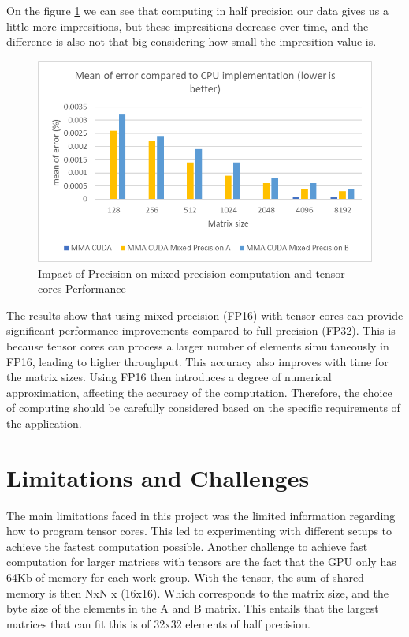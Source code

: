 \documentclass[conference]{IEEEtran}
\begin{document}
  On the figure \ref{fig:precision-impact2} we can see that computing in half precision our data gives us a little more 
  impresitions, but these impresitions decrease over time, and the difference is also not that big considering how small the 
  impresition value is.

  \begin{figure}[htbp]
    \centering
    \includegraphics[scale=0.6]{figures/Mean of error MP.png}
    \caption{Impact of Precision on mixed precision computation and tensor cores Performance}
    \label{fig:precision-impact2}
  \end{figure}
  
  The results show that using mixed precision (FP16) with tensor cores can provide significant performance improvements compared to full precision (FP32).
  This is because tensor cores can process a larger number of elements simultaneously in FP16,
  leading to higher throughput. This accuracy also improves with time for the matrix sizes.
  Using FP16 then introduces a degree of numerical approximation, affecting the accuracy of the computation.
  Therefore, the choice of computing should be carefully considered based on the specific
  requirements of the application. 
  
  
  \section{Limitations and Challenges}\label{sec:limitations-challenges}
  The main limitations faced in this project was the limited information regarding how to program tensor cores.
  This led to experimenting with different setups to achieve the fastest computation possible.
  Another challenge to achieve fast computation for larger matrices with tensors are the fact that the GPU 
  only has 64Kb of memory for each work group. With the tensor, the sum of shared memory is then NxN x (16x16).
  Which corresponds to the matrix size, and the byte size of the elements in the A and B matrix. This entails that the 
  largest matrices that can fit this is of 32x32 elements of half precision.
\end{document}
